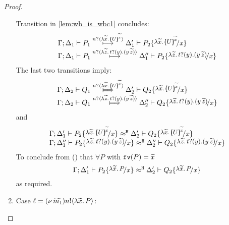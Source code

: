 \begin{proof}
\begin{enumerate}
				\noi Transition in \eqref{lem:wb_is_wbc1} concludes:
				\[
					\begin{array}{l}
						\horel{\Gamma}{\Delta_1}{P_1}{\hby{\bactinp{n}{\abs{\widetilde{x}}{\mapchar{U}{\widetilde{x}}}}}}{\Delta_1'}{P_2 \subst{\abs{\widetilde{x}}{\mapchar{U}{\widetilde{x}}}}{x}}\\
						\horel{\Gamma}{\Delta_1}{P_1}{\hby{\bactinp{n}{\auxtr{t}}}}{\Delta_1''}{P_2 \subst{\auxtr{t}}{x}}
					\end{array}
				\]
				\noi The last two transitions imply:
			\[
				\begin{array}{l}
					\horel{\Gamma}{\Delta_2}{Q_1}{\Hby{\bactinp{n}{\abs{\widetilde{x}}{\mapchar{U}{\widetilde{x}}}}}}{\Delta_2'}{Q_2 \subst{\abs{\widetilde{x}}{\mapchar{U}{\widetilde{x}}}}{x}}\\
					\horel{\Gamma}{\Delta_2}{Q_1}{\Hby{\bactinp{n}{\auxtr{t}}}}{\Delta_2''}{Q_2 \subst{\auxtr{t}}{x}}
				\end{array}
			\]
				\noi and
			\[
				\begin{array}{l}
					\horel{\Gamma}{\Delta_1'}{P_2 \subst{\abs{\widetilde{x}}{\mapchar{U}{\widetilde{x}}}}{x}}{\hwb}{\Delta_2'}{Q_2 \subst{\abs{\widetilde{x}}{\mapchar{U}{\widetilde{x}}}}{x}}\\
					\horel{\Gamma}{\Delta_1''}{P_2 \subst{\auxtr{t}}{x}}{\hwb}{\Delta_2''}{Q_2 \subst{\auxtr{t}}{x}}
				\end{array}
			\]
				\noi To conclude from () that
				$\forall P$ with $\mathtt{fv}(P) = \widetilde{x}$
			\[
				\horel{\Gamma}{\Delta_1'}{P_2 \subst{\abs{\widetilde{x}}{P}}{x}}{\hwb}{\Delta_2'}{Q_2 \subst{\abs{\widetilde{x}}{P}}{x}}
			\]
				\noi as required.

		\item	Case $\ell = (\nu\, \widetilde{m_1}) n ! \langle \lambda \widetilde{x}.\,P \rangle$:


\end{enumerate}
\end{proof}
